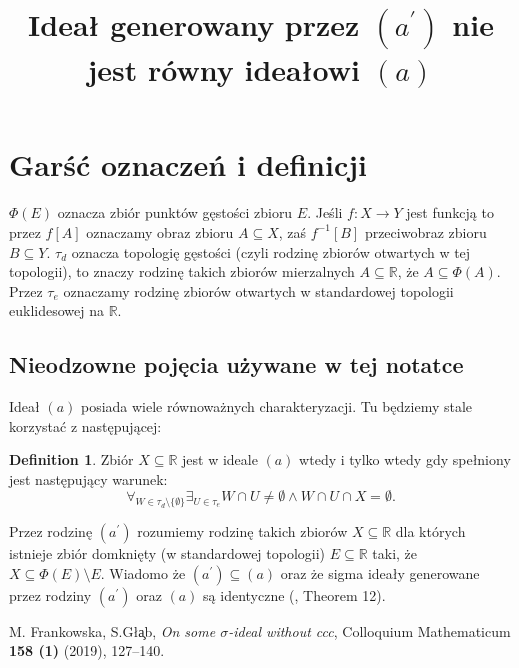 \documentclass[12pt]{amsart}
\theoremstyle{plain}
\theoremstyle{definition}
\newtheorem{definition}[theorem]{Definition}
\theoremstyle{remark}
\newcommand{\real}{\mathbb{R}}
\newcommand{\aideal}{\mathit{(a)}}
\newcommand{\aidealprime}{\mathit{(a^\prime)}}
\begin{document}
\title{Ideał generowany przez $\aidealprime$ nie jest równy ideałowi $\aideal$}


\maketitle

\section{Garść oznaczeń i definicji}
$\Phi(E)$ oznacza zbiór punktów gęstości zbioru $E$.
Jeśli $f \colon X \to Y$ jest funkcją to przez
$f[A]$ oznaczamy obraz zbioru $A\subseteq X$, 
zaś $f^{-1}[B]$ przeciwobraz zbioru $B \subseteq Y$.
$\tau_d$ oznacza topologię gęstości
(czyli rodzinę zbiorów otwartych w tej topologii),
to znaczy rodzinę takich zbiorów mierzalnych $A\subseteq\real$,
że $A \subseteq \Phi(A)$. Przez $\tau_e$ oznaczamy rodzinę
zbiorów otwartych w standardowej topologii euklidesowej na $\real$.

\subsection{Nieodzowne pojęcia używane w tej notatce}
Ideał $\aideal$ posiada wiele równoważnych charakteryzacji.
Tu będziemy stale korzystać z następującej:
\begin{definition}
  Zbiór $X \subseteq \real$ jest w ideale $\aideal$ wtedy i tylko
  wtedy gdy spełniony jest następujący warunek:
  \[
  \forall_{W \in \tau_d\setminus\lbrace\emptyset\rbrace}
    \exists_{U \in \tau_e} W \cap U \not= \emptyset \wedge
    W \cap U \cap X = \emptyset.
  \]
\end{definition}

Przez rodzinę $\aidealprime$ rozumiemy rodzinę takich zbiorów
$X\subseteq\real$ dla których istnieje zbiór
domknięty (w standardowej topologii) $E \subseteq\real$
taki, że $X \subseteq \Phi(E) \setminus E$. Wiadomo
że $\aidealprime\subseteq\aideal$ oraz że sigma ideały
generowane przez rodziny $\aidealprime$ oraz $\aideal$
są identyczne (\cite{FG}, Theorem 12).
\begin{thebibliography}{10}

M. Frankowska, S.G\l{}\c{a}b, 
\emph{On some $\sigma$-ideal without ccc}, Colloquium Mathematicum \textbf{158 (1)} (2019), 127--140.
\end{thebibliography}
\end{document}
